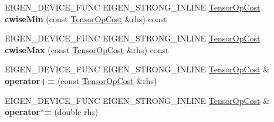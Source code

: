 \begin{DoxyCompactItemize}
E\+I\+G\+E\+N\+\_\+\+D\+E\+V\+I\+C\+E\+\_\+\+F\+U\+NC E\+I\+G\+E\+N\+\_\+\+S\+T\+R\+O\+N\+G\+\_\+\+I\+N\+L\+I\+NE \hyperlink{class_eigen_1_1_tensor_op_cost}{Tensor\+Op\+Cost} {\bfseries cwise\+Min} (const \hyperlink{class_eigen_1_1_tensor_op_cost}{Tensor\+Op\+Cost} \&rhs) const
\item 
\mbox{\label{class_eigen_1_1_tensor_op_cost_a41a42f41c2b31092bfaae8b34e8120c5}} 
E\+I\+G\+E\+N\+\_\+\+D\+E\+V\+I\+C\+E\+\_\+\+F\+U\+NC E\+I\+G\+E\+N\+\_\+\+S\+T\+R\+O\+N\+G\+\_\+\+I\+N\+L\+I\+NE \hyperlink{class_eigen_1_1_tensor_op_cost}{Tensor\+Op\+Cost} {\bfseries cwise\+Max} (const \hyperlink{class_eigen_1_1_tensor_op_cost}{Tensor\+Op\+Cost} \&rhs) const
\item 
\mbox{\label{class_eigen_1_1_tensor_op_cost_a30660514bb69f91a0f993e1869797a03}} 
E\+I\+G\+E\+N\+\_\+\+D\+E\+V\+I\+C\+E\+\_\+\+F\+U\+NC E\+I\+G\+E\+N\+\_\+\+S\+T\+R\+O\+N\+G\+\_\+\+I\+N\+L\+I\+NE \hyperlink{class_eigen_1_1_tensor_op_cost}{Tensor\+Op\+Cost} \& {\bfseries operator+=} (const \hyperlink{class_eigen_1_1_tensor_op_cost}{Tensor\+Op\+Cost} \&rhs)
\item 
\mbox{\label{class_eigen_1_1_tensor_op_cost_a40b904633b50a3b8b8c788f6f53644c7}} 
E\+I\+G\+E\+N\+\_\+\+D\+E\+V\+I\+C\+E\+\_\+\+F\+U\+NC E\+I\+G\+E\+N\+\_\+\+S\+T\+R\+O\+N\+G\+\_\+\+I\+N\+L\+I\+NE \hyperlink{class_eigen_1_1_tensor_op_cost}{Tensor\+Op\+Cost} \& {\bfseries operator$\ast$=} (double rhs)
\end{DoxyCompactItemize}
